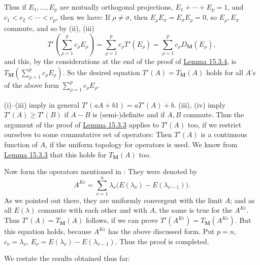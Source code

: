 \documentclass[12pt,b5paper,twoside]{article}
\newcommand{\M}{\mathbf M}
\newcommand{\lemref}[1]{\hyperref[lem:#1]{Lemma #1}}
\begin{document}
Thus if \(E_1,\ldots,E_p\) are mutually orthogonal projections,
\(E_1+\cdots+E_p=1\), and \(c_1<c_2<\cdots<c_p\), then we have: If
\(\rho\ne\sigma\), then \(E_\rho E_\sigma=E_\sigma E_\rho=0\), so
\(E_\rho,E_\sigma\) commute, and so by (ii), (iii)
\[
T'\left(\sum_{\rho=1}^pc_\rho E_\rho\right)
=\sum_{\rho=1}^pc_\rho T'(E_\rho)
=\sum_{\rho=1}^pc_\rho D_{\M}(E_\rho),
\]
and this, by the considerations at the end of the proof of \lemref{15.3.4},
is \(T_{\M}(\sum_{\rho=1}^pc_\rho E_\rho)\). So the desired equation
\(T'(A)=T_{\M}(A)\) holds for all \(A\)'s of the above form
\(\sum_{\rho=1}^pc_\rho E_\rho\).

(i)--(iii) imply in general \(T'(aA+b1)=aT'(A)+b\). (iii), (iv) imply
\(T'(A)\geq T'(B)\) if \(A-B\) is (semi-)definite and if \(A,B\) commute.
Thus the argument of the proof of \lemref{15.3.3} applies to \(T'(A)\) too,
if we restrict ourselves to some commutative set of operators: Then
\(T'(A)\) is a continuous function of \(A\), if the uniform topology for
operators is used. We know from \lemref{15.3.3} that this holds for
\(T_{\M}(A)\) too.

Now form the operators mentioned in
\cite[pp.~390--391, in particular footnote~43]{ref18}: They were denoted by
\[
A^{K\epsilon}=\sum_{\nu=1}^n\lambda_\nu
   \bigl(E(\lambda_\nu)-E(\lambda_{\nu-1})\bigr).
\]
As we pointed out there, they are uniformly convergent with the limit \(A\);
and as all \(E(\lambda)\) commute with each other and with \(A\), the same is
true for the \(A^{K\epsilon}\). Thus \(T'(A)=T_{\M}(A)\) follows, if we can
prove \(T'(A^{K\epsilon})=T_{\M}(A^{K\epsilon})\). But this equation holds,
because \(A^{K\epsilon}\) has the above discussed form. Put \(p=n\),
\(c_\nu=\lambda_\nu\),
\(E_\nu=E(\lambda_\nu)-E(\lambda_{\nu-1})\). Thus the proof is completed.

We restate the results obtained thus far:
\end{document}

